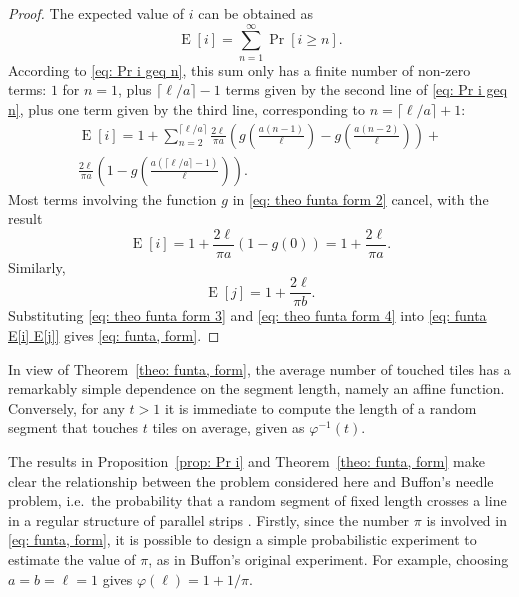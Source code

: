 \documentclass[12pt, a4paper]{article}
\DeclareMathOperator{\E}{E}
\newcommand{\funta}{\varphi} %
\newcommand{\len}{\ell} %
\begin{document}
\begin{proof}
The expected value of $i$ can be obtained as
\begin{equation}
\label{eq: theo funta form 1}
\E[i] = \sum_{n=1}^\infty \Pr[i \geq n].
\end{equation}
According to \eqref{eq: Pr i geq n}, this sum only has a finite number of non-zero terms: $1$ for $n=1$, plus $\lceil \len/a \rceil-1$ terms given by the second line of \eqref{eq: Pr i geq n}, plus one term given by the third line, corresponding to $n = \lceil \len/a \rceil +1 $:
\begin{equation}
\label{eq: theo funta form 2}
\begin{split}
\E[i] = 1 +
\sum_{n=2}^{\lceil \len/a \rceil} \frac{2\len}{\pi a} \left(g\left(\frac{a(n-1)}{\len}\right)-g\left(\frac{a(n-2)}{\len} \right)\right) + \\
\frac{2\len}{\pi a} \left(1-g\left(\frac{a(\lceil \len/a \rceil - 1)}{\len} \right)\right).
\end{split}
\end{equation}
Most terms involving the function $g$ in \eqref{eq: theo funta form 2} cancel, with the result
\begin{equation}
\label{eq: theo funta form 3}
\E[i] = 1+\frac{2\len}{\pi a} (1-g(0))= 1+\frac{2\len}{\pi a}.
\end{equation}
Similarly,
\begin{equation}
\label{eq: theo funta form 4}
\E[j] = 1+\frac{2\len}{\pi b}.
\end{equation}
Substituting \eqref{eq: theo funta form 3} and \eqref{eq: theo funta form 4} into \eqref{eq: funta E[i] E[j]} gives \eqref{eq: funta, form}.
\end{proof}

In view of Theorem~\ref{theo: funta, form}, the average number of touched tiles has a remarkably simple dependence on the segment length, namely an affine function. Conversely, for any $t>1$ it is immediate to compute the length of a random segment that touches $t$ tiles on average, given as $\funta^{-1}(t)$.

The results in Proposition~\ref{prop: Pr i} and Theorem~\ref{theo: funta, form} make clear the relationship between the problem considered here and Buffon's needle problem, i.e.~the probability that a random segment of fixed length crosses a line in a regular structure of parallel strips \cite[section 1.1]{Mathai99}. Firstly, since the number $\pi$ is involved in \eqref{eq: funta, form}, it is possible to design a simple probabilistic experiment to estimate the value of $\pi$, as in Buffon's original experiment. For example, choosing $a=b=\len=1$ gives $\funta(\len) = 1+1/\pi$.
\end{document}

